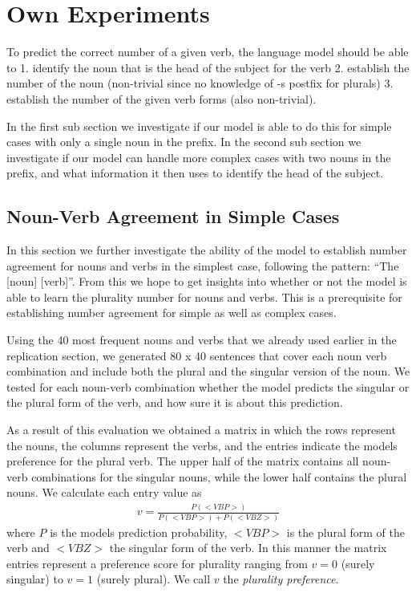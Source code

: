 \section{Own Experiments}
\label{own-experiments}
To predict the correct number of a given verb,
the language model should be able to
1. identify the noun that is the head of the subject for the verb
2. establish the number of the noun (non-trivial since no knowledge of -s postfix for plurals)
3. establish the number of the given verb forms (also non-trivial).

In the first sub section we investigate if our model is able to
do this for simple cases with only a single noun in the prefix.
%
In the second sub section we investigate if our model can handle
more complex cases with two nouns in the prefix,
and what information it then uses to identify the head of the subject.


\subsection{Noun-Verb Agreement in Simple Cases}

In this section we further investigate the ability of the model to
establish number agreement for nouns and verbs in the simplest case,
following the pattern: ``The [noun] [verb]''. 
From this we hope to get insights into whether or not the model is able 
to learn the plurality number for nouns and verbs.
This is a prerequisite for establishing number agreement
for simple as well as complex cases.

Using the 40 most frequent nouns and verbs that we already used earlier in the replication section, we generated 80 x 40 sentences that cover each noun verb combination and include both the plural and the singular version of the noun. 
We tested for each noun-verb combination whether the model 
predicts the singular or the plural form of the verb,
and how sure it is about this prediction.

As a result of this evaluation we obtained a matrix in which 
the rows represent the nouns,
the columns represent the verbs, and
the entries indicate the models preference for the plural verb. 
The upper half of the matrix contains all noun-verb combinations for the singular nouns, while the lower half contains the plural nouns. 
We calculate each entry value as
\begin{align*}
	v = \frac{P(<VBP>)}{P(<VBP>) + P(<VBZ>)} 
\end{align*}
where $P$ is the models prediction probability, $<VBP>$ is the plural 
form of the verb and $<VBZ>$ the singular form of the verb. 
In this manner the matrix entries represent 
a preference score for plurality ranging from
$v=0$ (surely singular) to $v=1$ (surely plural). 
We call $v$ the \textit{plurality preference}. 

